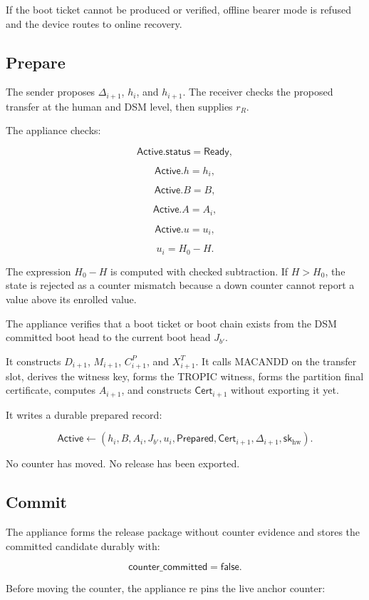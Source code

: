 \documentclass[11pt]{article}
\theoremstyle{definition}
\theoremstyle{remark}
\newcommand{\Cert}{\ensuremath{\mathsf{Cert}}}
\newcommand{\Active}{\ensuremath{\mathsf{Active}}}
\newcommand{\Ready}{\ensuremath{\mathsf{Ready}}}
\newcommand{\Prepared}{\ensuremath{\mathsf{Prepared}}}
\newcommand{\Bundle}{\ensuremath{B}}
\newcommand{\Ahead}{\ensuremath{A}}
\newcommand{\Bhead}{\ensuremath{J}}
\newcommand{\skhw}{\ensuremath{\mathsf{sk}_{\mathrm{hw}}}}
\begin{document}
If the boot ticket cannot be produced or verified, offline bearer mode is refused and the device
routes to online recovery.

\subsection{Prepare}

The sender proposes \(\Delta_{i+1}\), \(h_i\), and \(h_{i+1}\). The receiver checks the proposed
transfer at the human and DSM level, then supplies \(r_R\).

The appliance checks:

\[
\Active.\mathsf{status}=\Ready,
\]

\[
\Active.h=h_i,
\]

\[
\Active.\Bundle=\Bundle,
\]

\[
\Active.\Ahead=\Ahead_i,
\]

\[
\Active.u=u_i,
\]

\[
u_i=H_0-H.
\]

The expression \(H_0-H\) is computed with checked subtraction. If \(H>H_0\), the state is rejected
as a counter mismatch because a down counter cannot report a value above its enrolled value.

The appliance verifies that a boot ticket or boot chain exists from the DSM committed boot head
to the current boot head \(\Bhead_{b'}\).

It constructs \(D_{i+1}\), \(M_{i+1}\), \(C^P_{i+1}\), and \(X^T_{i+1}\). It calls MACANDD on the
transfer slot, derives the witness key, forms the TROPIC witness, forms the partition final
certificate, computes \(\Ahead_{i+1}\), and constructs \(\Cert_{i+1}\) without exporting it yet.

It writes a durable prepared record:

\[
\Active
\leftarrow
(
h_i,
\Bundle,
\Ahead_i,
\Bhead_{b'},
u_i,
\Prepared,
\Cert_{i+1},
\Delta_{i+1},
\skhw
).
\]

No counter has moved. No release has been exported.

\subsection{Commit}

The appliance forms the release package without counter evidence and stores the committed candidate
durably with:

\[
\mathsf{counter\_committed}=\mathsf{false}.
\]

Before moving the counter, the appliance re pins the live anchor counter:
\end{document}
